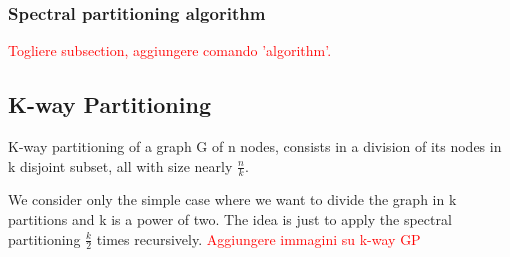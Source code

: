 \documentclass[12 pt]{article}
\begin{document}
\subsubsection{Spectral partitioning algorithm}
\textcolor{red}{Togliere subsection, aggiungere comando 'algorithm'.}
\begin{center}
\end{center}


\subsection{K-way Partitioning}
K-way partitioning of a graph G of n nodes, consists in a division of its nodes in k disjoint subset, all with size nearly $\frac{n}{k}$.

We consider only the simple case where we want to divide the graph in k partitions and k is a power of two. The idea is just to apply the spectral partitioning $\frac{k}{2}$ times recursively.
\textcolor{red}{Aggiungere immagini su k-way GP}
\end{document}

